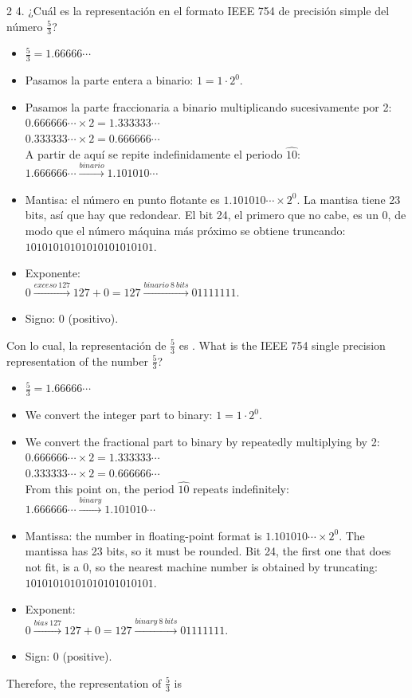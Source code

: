 \begin{paracol}{2}
4. ¿Cuál es la representación en el formato IEEE 754 de precisión simple del número $\frac{5}{3}$?
\begin{itemize}[leftmargin=\dimexpr 26pt-.25in]
\item $\frac{5}{3}=1.66666\cdots$
\item Pasamos la parte entera a binario: $1=1\cdot 2^0$.
\item Pasamos la parte fraccionaria a binario multiplicando sucesivamente por 2:\\
$0.666666\cdots\times 2=1.333333\cdots$\\
$0.333333\cdots\times 2=0.666666\cdots$\\
A partir de aquí se repite indefinidamente el periodo $\widehat{10}$: $1.666666\cdots  \xrightarrow{binario} 1.101010\cdots$
\item Mantisa: el número en punto flotante es $1.101010\cdots \times 2^0$. La mantisa tiene 23 bits, así que hay que redondear. El bit 24, el primero que no cabe, es un 0, de modo que el número máquina más próximo se obtiene truncando: $10101010101010101010101$.
\item Exponente:\\
$0 \xrightarrow{exceso\ 127} 127+0=127  \xrightarrow{binario \ 8 \ bits} 01111111$.
\item Signo: 0 (positivo).
\end{itemize}
Con lo cual, la representación de $\frac{5}{3}$ es
. What is the IEEE 754 single precision representation of the number $\frac{5}{3}$?
\begin{itemize}[leftmargin=\dimexpr 26pt-.25in]
\item $\frac{5}{3}=1.66666\cdots$
\item We convert the integer part to binary: $1=1\cdot 2^0$.
\item We convert the fractional part to binary by repeatedly multiplying by 2:\\
$0.666666\cdots\times 2=1.333333\cdots$\\
$0.333333\cdots\times 2=0.666666\cdots$\\
From this point on, the period $\widehat{10}$ repeats indefinitely: $1.666666\cdots  \xrightarrow{binary} 1.101010\cdots$
\item Mantissa: the number in floating-point format is $1.101010\cdots \times 2^0$. The mantissa has 23 bits, so it must be rounded. Bit 24, the first one that does not fit, is a 0, so the nearest machine number is obtained by truncating: $10101010101010101010101$.
\item Exponent:\\
$0 \xrightarrow{bias\ 127} 127+0=127  \xrightarrow{binary \ 8 \ bits} 01111111$.
\item Sign: 0 (positive).
\end{itemize}
Therefore, the representation of $\frac{5}{3}$ is
\end{paracol}
